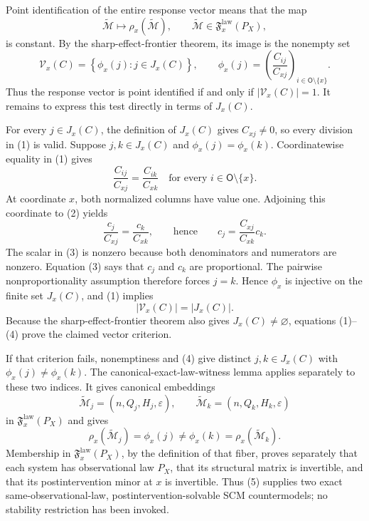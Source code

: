 Point identification of the entire response vector means that the map
\[
 \widetilde{\mathcal M}\longmapsto\rho_x(\widetilde{\mathcal M}),
 \qquad
 \widetilde{\mathcal M}\in\mathfrak F_x^{\mathrm{law}}(P_X),
\]
is constant. By the sharp-effect-frontier theorem, its image is the nonempty set
\[
 \mathcal V_x(C)
 =\left\{\phi_x(j):j\in J_x(C)\right\},
 \qquad
 \phi_x(j)=\left(\frac{C_{ij}}{C_{xj}}\right)_{i\in\mathsf O\setminus\{x\}}. \tag{1}
\]
Thus the response vector is point identified if and only if \(|\mathcal V_x(C)|=1\). It remains to express this test directly in terms of \(J_x(C)\).

For every \(j\in J_x(C)\), the definition of \(J_x(C)\) gives \(C_{xj}\ne0\), so every division in (1) is valid. Suppose \(j,k\in J_x(C)\) and \(\phi_x(j)=\phi_x(k)\). Coordinatewise equality in (1) gives
\[
 \frac{C_{ij}}{C_{xj}}=\frac{C_{ik}}{C_{xk}}
 \quad\text{for every }i\in\mathsf O\setminus\{x\}. \tag{2}
\]
At coordinate \(x\), both normalized columns have value one. Adjoining this coordinate to (2) yields
\[
 \frac{c_j}{C_{xj}}=\frac{c_k}{C_{xk}},
 \qquad\text{hence}\qquad
 c_j=\frac{C_{xj}}{C_{xk}}c_k. \tag{3}
\]
The scalar in (3) is nonzero because both denominators and numerators are nonzero. Equation (3) says that \(c_j\) and \(c_k\) are proportional. The pairwise nonproportionality assumption therefore forces \(j=k\). Hence \(\phi_x\) is injective on the finite set \(J_x(C)\), and (1) implies
\[
 |\mathcal V_x(C)|=|J_x(C)|. \tag{4}
\]
Because the sharp-effect-frontier theorem also gives \(J_x(C)\ne\varnothing\), equations (1)--(4) prove the claimed vector criterion.

If that criterion fails, nonemptiness and (4) give distinct \(j,k\in J_x(C)\) with \(\phi_x(j)\ne\phi_x(k)\). The canonical-exact-law-witness lemma applies separately to these two indices. It gives canonical embeddings
\[
 \widetilde{\mathcal M}_j=(n,Q_j,H_j,\varepsilon),
 \qquad
 \widetilde{\mathcal M}_k=(n,Q_k,H_k,\varepsilon)
\]
in \(\mathfrak F_x^{\mathrm{law}}(P_X)\) and gives
\[
 \rho_x(\widetilde{\mathcal M}_j)=\phi_x(j)\ne
 \phi_x(k)=\rho_x(\widetilde{\mathcal M}_k). \tag{5}
\]
Membership in \(\mathfrak F_x^{\mathrm{law}}(P_X)\), by the definition of that fiber, proves separately that each system has observational law \(P_X\), that its structural matrix is invertible, and that its postintervention minor at \(x\) is invertible. Thus (5) supplies two exact same-observational-law, postintervention-solvable SCM countermodels; no stability restriction has been invoked.

